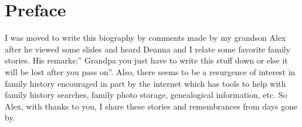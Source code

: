 \chapter{Preface}

I was moved to write this biography by comments made by my grandson Alex after he viewed some slides and heard Deanna and I relate some favorite family stories. His remarks:” Grandpa you just have to write this stuff down or else it will be lost after you pass on”. Also, there seems to be a resurgence of interest in family history encouraged in part by the internet which has tools to help with family history searches, family photo storage, genealogical information, etc. So Alex, with thanks to you, I share these stories and remembrances from days gone by.